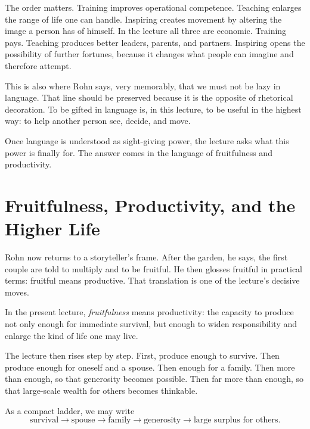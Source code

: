 The order matters. Training improves operational competence. Teaching enlarges the range of life one can handle. Inspiring creates movement by altering the image a person has of himself. In the lecture all three are economic. Training pays. Teaching produces better leaders, parents, and partners. Inspiring opens the possibility of further fortunes, because it changes what people can imagine and therefore attempt.

This is also where Rohn says, very memorably, that we must not be lazy in language. That line should be preserved because it is the opposite of rhetorical decoration. To be gifted in language is, in this lecture, to be useful in the highest way: to help another person see, decide, and move.

Once language is understood as sight-giving power, the lecture asks what this power is finally for. The answer comes in the language of fruitfulness and productivity.

\section{Fruitfulness, Productivity, and the Higher Life}

Rohn now returns to a storyteller's frame. After the garden, he says, the first couple are told to multiply and to be fruitful. He then glosses fruitful in practical terms: fruitful means productive. That translation is one of the lecture's decisive moves.

\begin{definition}
In the present lecture, \emph{fruitfulness} means productivity: the capacity to produce not only enough for immediate survival, but enough to widen responsibility and enlarge the kind of life one may live.
\end{definition}

The lecture then rises step by step. First, produce enough to survive. Then produce enough for oneself and a spouse. Then enough for a family. Then more than enough, so that generosity becomes possible. Then far more than enough, so that large-scale wealth for others becomes thinkable.

As a compact ladder, we may write
\begin{equation}
\text{survival} \to \text{spouse} \to \text{family} \to \text{generosity} \to \text{large surplus for others}.
\end{equation}

